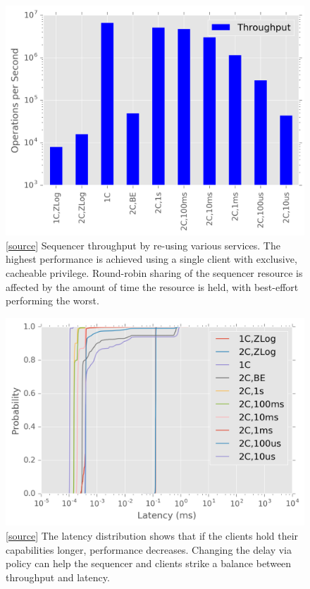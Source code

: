 \documentclass[10pt,twocolumn]{article}
\begin{document}
\begin{figure}[h]
\centering
\includegraphics{figures/caps-delay-thruput.png}
\caption{[\href{https://github.com/double-blind-submitter/osdi16}{source}]
Sequencer throughput by re-using various services.  The highest performance is
achieved using a single client with exclusive, cacheable privilege. Round-robin
sharing of the sequencer resource is affected by the amount of time the
resource is held, with best-effort performing the worst.}
\label{fig:captp}
\end{figure}

\begin{figure}[h]
\centering
\includegraphics{figures/caps-delay-latency.png}
\caption{[\href{https://github.com/double-blind-submitter/osdi16}{source}] The
latency distribution shows that if the clients hold their capabilities longer,
performance decreases. Changing the delay via policy can help the sequencer and
clients strike a balance between throughput and latency.}
\label{fig:capcdf}
\end{figure}
\end{document}
